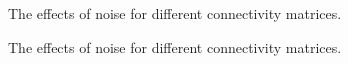 \documentclass[10pt,a4paper]{article}
\begin{document}
\begin{figure}[H]
    \centering
    \qquad
    \caption{The effects of noise for different connectivity matrices. }
    \label{fig:current_noise}%
\end{figure}


\begin{figure}[H]
    \centering
    \qquad
    \caption{The effects of noise for different connectivity matrices. }
	\label{fig:matrix_noise}
\end{figure}
\end{document}
